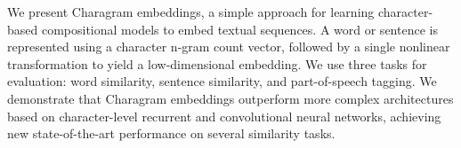 We present Charagram embeddings, a simple approach for learning character-based compositional models to embed textual sequences. A word or sentence is represented using a character n-gram count vector, followed by a single nonlinear transformation to yield a low-dimensional embedding. We use three tasks for evaluation: word similarity, sentence similarity, and part-of-speech tagging. We demonstrate that Charagram embeddings outperform more complex architectures based on character-level recurrent and convolutional neural networks, achieving new state-of-the-art performance on several similarity tasks.
